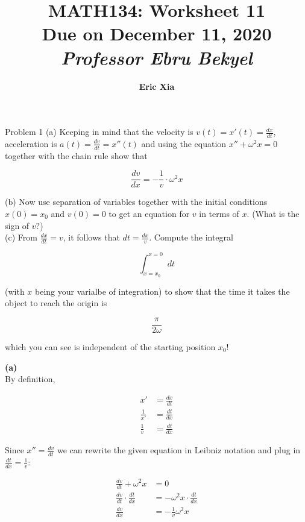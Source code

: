 \documentclass{article}
\title{
    \vspace{2in}
    \textmd{\textbf{MATH134: Worksheet 11}}\\
    \normalsize\vspace{0.1in}\small{Due on December 11, 2020}\\
    \vspace{0.1in}\large{\textit{Professor Ebru Bekyel}}
    \vspace{3in}
}
\author{\textbf{Eric Xia}}
\date{}
\begin{document}
    \maketitle
    \pagebreak

    \thispagestyle{2}


    \begin{tbhtheorem}{Problem 1}
        (a) Keeping in mind that the velocity is $v(t) = x'(t) = \frac{dx}{dt}$, acceleration is $a(t) = \frac{dv}{dt} = x''(t)$ and using the equation $x'' + {\omega}^2 x=0$ together with the chain rule show that

        \[
            \frac{dv}{dx} = -\frac{1}{v}\cdot {\omega}^2 x
        \]

        (b) Now use separation of variables together with the initial conditions $x(0) = x_0$ and $v(0) = 0$ to get an equation for $v$ in terms of $x$. (What is the sign of $v?$) \\
        (c) From $\frac{dx}{dt} = v$, it follows that $dt = \frac{dx}{v}$. Compute the integral

        \[
            \int_{x=x_0}^{x=0} dt
        \]

        (with $x$ being your varialbe of integration) to show that the time it takes the object to reach the origin is

        \[
            \frac{\pi}{2\omega}
        \]

        which you can see is independent of the starting position $x_0$!
    \end{tbhtheorem}

    \textbf{(a)} \\
    By definition,

    \begin{align*}
        x'              &= \frac{dx}{dt} \\
        \frac{1}{x'}    &= \frac{dt}{dx} \\
        \frac{1}{v}     &= \frac{dt}{dx}
    \end{align*}

    Since $x'' = \frac{dv}{dt}$ we can rewrite the given equation in Leibniz notation and plug in $\frac{dt}{dx} = \frac{1}{v}$:

    \begin{align*}
        \frac{dv}{dt}       + \omega^2 x        &= 0 \\
        \frac{dv}{dt} \cdot \frac{dt}{dx}       &= -\omega^2 x \cdot \frac{dt}{dx} \\
        \frac{dv}{dx}                           &= -\frac{1}{v} \omega^2 x
    \end{align*}
\end{document}
